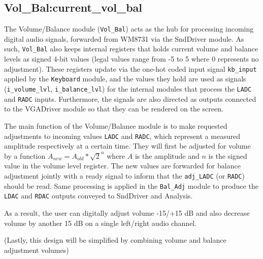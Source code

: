 \subsection{Vol\_Bal:current\_vol\_bal}

The Volume/Balance module (\verb=Vol_Bal=) acts as the hub for processing incoming digital audio signals, forwarded from WM8731 via the SndDriver module. As such, \verb=Vol_Bal= also keeps internal registers that holds current volume and balance levels as signed 4-bit values (legal values range from -5 to 5 where 0 represents no adjustment). These registers update via the one-hot coded input signal \verb=kb_input= applied by the \verb=Keyboard= module, and the values they hold are used as signals (\verb=i_volume_lvl=, \verb=i_balance_lvl=) for the internal modules that process the \verb=LADC= and \verb=RADC= inputs. Furthermore, the signals are also directed as outputs connected to the VGADriver module so that they can be rendered on the screen.

The main function of the Volume/Balance module is to make requested adjustments to incoming values \verb=LADC= and \verb=RADC=, which represent a measured amplitude respectively at a certain time. They will first be adjusted for volume by a function $A_{new} = A_{old} * \sqrt{2}^n$ where $A$ is the amplitude and $n$ is the signed value in the volume level register. The new values are forwarded for balance adjustment jointly with a ready signal to inform that the \verb=adj_LADC= (or \verb=RADC=) should be read. Same processing is applied in the \verb=Bal_Adj= module to produce the \verb=LDAC= and \verb=RDAC= outputs conveyed to SndDriver and Analysis.

As a result, the user can digitally adjust volume -15/+15 dB and also decrease volume by another 15 dB on a single left/right audio channel.

(Lastly, this design will be simplified by combining volume and balance adjustment volumes)
